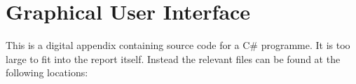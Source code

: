 \chapter{Graphical User Interface}
\label{app:C}
This is a digital appendix containing source code for a C\# programme. It is too large to fit into the report itself.
Instead the relevant files can be found at the following locations:

\setlength{\parindent}{0pt} {
 \\

}
